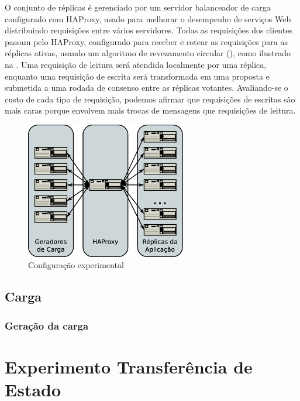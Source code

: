 O conjunto de réplicas é gerenciado por um servidor balanceador de carga configurado com
HAProxy, usado para melhorar o desempenho de serviços Web distribuindo requisições entre
vários servidores. Todas as requisições dos clientes passam pelo HAProxy, configurado para
receber e rotear as requisições para as réplicas ativas, usando um algoritmo de
revezamento circular (), como ilustrado na . Uma
requisição de leitura será  atendida localmente por uma réplica, enquanto uma requisição
de escrita será transformada em uma proposta e submetida a uma rodada de consenso entre as
réplicas votantes. Avaliando-se o custo de cada tipo de requisição, podemos afirmar que
requisições de escritas são mais caras porque envolvem mais trocas de mensagens que
requisições de leitura.

\begin{figure}[ht]
  \centering
  \includegraphics[width=7cm]{conteudo/capitulos/figuras/experimental-setup.dia.eps}
  \caption{Configuração experimental}
  \label{fig:setup}
\end{figure}

\subsection{Carga}

\subsubsection{Geração da carga}

\section{Experimento Transferência de Estado}\label{sec:experimento_tranferencia_estado}


